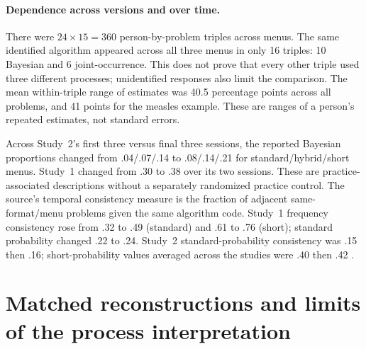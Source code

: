 \paragraph{Dependence across versions and over time.}
There were \(24\times15=360\) person-by-problem triples across menus.
The same identified algorithm appeared across all three menus in only 16
triples: 10 Bayesian and 6 joint-occurrence. This does not prove that every
other triple used three different processes; unidentified responses also
limit the comparison. The mean within-triple range of estimates was 40.5
percentage points across all problems, and 41 points for the measles example.
These are ranges of a person's repeated estimates, not standard errors.

Across Study~2's first three versus final three sessions, the reported Bayesian
proportions changed from .04/.07/.14 to .08/.14/.21 for standard/hybrid/short
menus. Study~1 changed from .30 to .38 over its two sessions. These are
practice-associated descriptions without a separately randomized practice
control. The source's temporal consistency measure is the fraction of adjacent
same-format/menu problems given the same algorithm code. Study~1 frequency
consistency rose from .32 to .49 (standard) and .61 to .76 (short); standard
probability changed .22 to .24. Study~2 standard-probability consistency was
.15 then .16; short-probability values averaged across the studies were .40
then .42 \cite[pp.~696--697 and note~6]{GigerenzerHoffrage1995FrequencyFormats}.

\section{Matched reconstructions and limits of the process interpretation}
\label{sec:p19-frequency-reconstructions}

